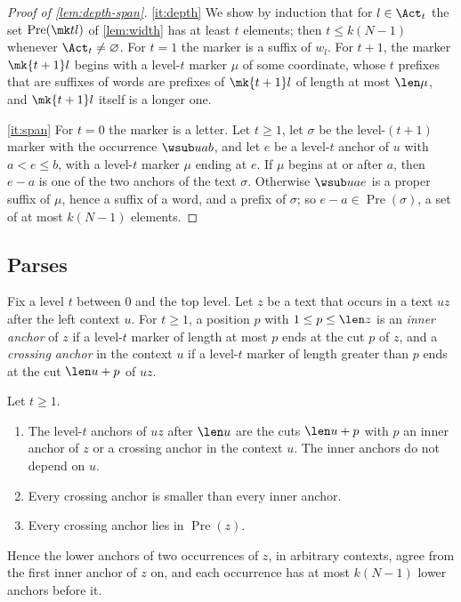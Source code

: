 \begin{proof}[Proof of \cref{lem:depth-span}]
\eqref{it:depth} We show by induction that for $l\in\Act_t$ the set
$\operatorname{Pre}(\mk tl)$ of \cref{lem:width} has at least $t$ elements;
then $t\le k(N-1)$ whenever $\Act_t\ne\varnothing$. For $t=1$ the marker is
a suffix of $w_l$. For $t+1$, the marker $\mk{t+1}l$ begins with a level-$t$
marker $\mu$ of some coordinate, whose $t$ prefixes that are suffixes of
words are prefixes of $\mk{t+1}l$ of length at most $\len\mu$, and
$\mk{t+1}l$ itself is a longer one.

\eqref{it:span} For $t=0$ the marker is a letter. Let $t\ge1$, let $\sigma$
be the level-$(t+1)$ marker with the occurrence $\wsub uab$, and let $e$ be
a level-$t$ anchor of $u$ with $a<e\le b$, with a level-$t$ marker $\mu$
ending at $e$. If $\mu$ begins at or after $a$, then $e-a$ is one of the two
anchors of the text $\sigma$. Otherwise $\wsub uae$ is a proper suffix of
$\mu$, hence a suffix of a word, and a prefix of $\sigma$; so
$e-a\in\operatorname{Pre}(\sigma)$, a set of at most $k(N-1)$ elements.
\end{proof}

\subsection{Parses}\label{app:fresh-parses}

Fix a level $t$ between $0$ and the top level. Let $z$ be a text that
occurs in a text $uz$ after the left context $u$. For $t\ge1$, a position
$p$ with $1\le p\le\len z$ is an \emph{inner anchor} of $z$ if a level-$t$
marker of length at most $p$ ends at the cut $p$ of $z$, and a
\emph{crossing anchor} in the context $u$ if a level-$t$ marker of length
greater than $p$ ends at the cut $\len u+p$ of $uz$.

\begin{lemma}\label{lem:parse-local}
Let $t\ge1$.
\begin{enumerate}
\item\label{it:pl-union} The level-$t$ anchors of $uz$ after $\len u$ are
  the cuts $\len u+p$ with $p$ an inner anchor of $z$ or a crossing anchor
  in the context $u$. The inner anchors do not depend on $u$.
\item\label{it:pl-order} Every crossing anchor is smaller than every inner
  anchor.
\item\label{it:pl-pre} Every crossing anchor lies in $\operatorname{Pre}(z)$.
\end{enumerate}
Hence the lower anchors of two occurrences of $z$, in arbitrary contexts,
agree from the first inner anchor of $z$ on, and each occurrence has at most
$k(N-1)$ lower anchors before it.
\end{lemma}

